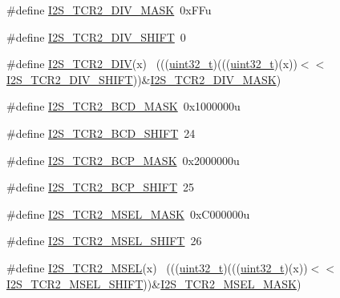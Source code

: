 \begin{DoxyCompactItemize}
\item 
\#define \hyperlink{group___i2_s___register___masks_ga9bbd597b1d3a839f74d15c3b6c309bb7}{I2\+S\+\_\+\+T\+C\+R2\+\_\+\+D\+I\+V\+\_\+\+M\+A\+SK}~0x\+F\+Fu
\item 
\#define \hyperlink{group___i2_s___register___masks_gad553f8b1c1cc03ded483d997640b410a}{I2\+S\+\_\+\+T\+C\+R2\+\_\+\+D\+I\+V\+\_\+\+S\+H\+I\+FT}~0
\item 
\#define \hyperlink{group___i2_s___register___masks_ga5e139ccca8c7599f321f14dce3b8782b}{I2\+S\+\_\+\+T\+C\+R2\+\_\+\+D\+IV}(x)                                                ~(((\hyperlink{_p_e___types_8h_a33594304e786b158f3fb30289278f5af}{uint32\+\_\+t})(((\hyperlink{_p_e___types_8h_a33594304e786b158f3fb30289278f5af}{uint32\+\_\+t})(x))$<$$<$\hyperlink{group___i2_s___register___masks_gad553f8b1c1cc03ded483d997640b410a}{I2\+S\+\_\+\+T\+C\+R2\+\_\+\+D\+I\+V\+\_\+\+S\+H\+I\+FT}))\&\hyperlink{group___i2_s___register___masks_ga9bbd597b1d3a839f74d15c3b6c309bb7}{I2\+S\+\_\+\+T\+C\+R2\+\_\+\+D\+I\+V\+\_\+\+M\+A\+SK})
\item 
\#define \hyperlink{group___i2_s___register___masks_gacd5946c8455382794be20e9454c7d688}{I2\+S\+\_\+\+T\+C\+R2\+\_\+\+B\+C\+D\+\_\+\+M\+A\+SK}~0x1000000u
\item 
\#define \hyperlink{group___i2_s___register___masks_ga2c6578a7b0e95314b9211083cd31494e}{I2\+S\+\_\+\+T\+C\+R2\+\_\+\+B\+C\+D\+\_\+\+S\+H\+I\+FT}~24
\item 
\#define \hyperlink{group___i2_s___register___masks_gacd80d1c94434950d1e8bd33024b04018}{I2\+S\+\_\+\+T\+C\+R2\+\_\+\+B\+C\+P\+\_\+\+M\+A\+SK}~0x2000000u
\item 
\#define \hyperlink{group___i2_s___register___masks_gaafb7626321ba09185e45c9136b804732}{I2\+S\+\_\+\+T\+C\+R2\+\_\+\+B\+C\+P\+\_\+\+S\+H\+I\+FT}~25
\item 
\#define \hyperlink{group___i2_s___register___masks_ga69d35574d74902b5a5dac263afe83957}{I2\+S\+\_\+\+T\+C\+R2\+\_\+\+M\+S\+E\+L\+\_\+\+M\+A\+SK}~0x\+C000000u
\item 
\#define \hyperlink{group___i2_s___register___masks_ga3f2208b190e1f9a951d300e726f6df76}{I2\+S\+\_\+\+T\+C\+R2\+\_\+\+M\+S\+E\+L\+\_\+\+S\+H\+I\+FT}~26
\item 
\#define \hyperlink{group___i2_s___register___masks_gac012ee5d2d891d34e59c65d965be67a7}{I2\+S\+\_\+\+T\+C\+R2\+\_\+\+M\+S\+EL}(x)                                              ~(((\hyperlink{_p_e___types_8h_a33594304e786b158f3fb30289278f5af}{uint32\+\_\+t})(((\hyperlink{_p_e___types_8h_a33594304e786b158f3fb30289278f5af}{uint32\+\_\+t})(x))$<$$<$\hyperlink{group___i2_s___register___masks_ga3f2208b190e1f9a951d300e726f6df76}{I2\+S\+\_\+\+T\+C\+R2\+\_\+\+M\+S\+E\+L\+\_\+\+S\+H\+I\+FT}))\&\hyperlink{group___i2_s___register___masks_ga69d35574d74902b5a5dac263afe83957}{I2\+S\+\_\+\+T\+C\+R2\+\_\+\+M\+S\+E\+L\+\_\+\+M\+A\+SK})

\end{DoxyCompactItemize}
